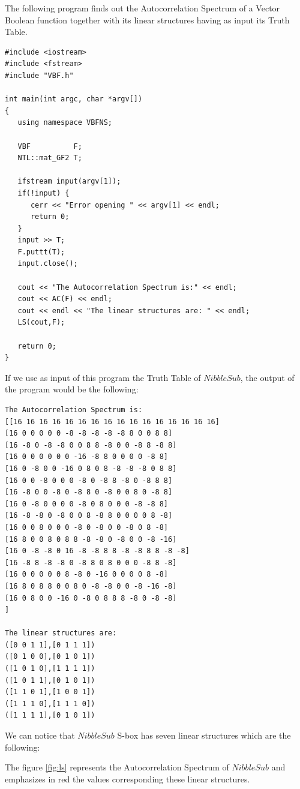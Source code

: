 \begin{example}
The following program finds out the Autocorrelation Spectrum of a Vector Boolean function together with its linear structures having as input its Truth Table.

\begin{verbatim}
#include <iostream>
#include <fstream>
#include "VBF.h"

int main(int argc, char *argv[])
{
   using namespace VBFNS;

   VBF          F;
   NTL::mat_GF2 T;

   ifstream input(argv[1]);
   if(!input) {
      cerr << "Error opening " << argv[1] << endl;
      return 0;
   }
   input >> T;
   F.puttt(T);
   input.close();

   cout << "The Autocorrelation Spectrum is:" << endl;
   cout << AC(F) << endl;
   cout << endl << "The linear structures are: " << endl;
   LS(cout,F);

   return 0;
}
\end{verbatim}

If we use as input of this program the Truth Table of $NibbleSub$, the output of the program would be the following:

\begin{verbatim}
The Autocorrelation Spectrum is:
[[16 16 16 16 16 16 16 16 16 16 16 16 16 16 16 16]
[16 0 0 0 0 0 -8 -8 -8 -8 -8 8 0 0 8 8]
[16 -8 0 -8 -8 0 0 8 8 -8 0 0 -8 8 -8 8]
[16 0 0 0 0 0 0 -16 -8 8 0 0 0 0 -8 8]
[16 0 -8 0 0 -16 0 8 0 8 -8 -8 -8 0 8 8]
[16 0 0 -8 0 0 0 -8 0 -8 8 -8 0 -8 8 8]
[16 -8 0 0 -8 0 -8 8 0 -8 0 0 8 0 -8 8]
[16 0 -8 0 0 0 0 -8 0 8 0 0 0 -8 -8 8]
[16 -8 -8 0 -8 0 0 8 -8 8 0 0 0 0 8 -8]
[16 0 0 8 0 0 0 -8 0 -8 0 0 -8 0 8 -8]
[16 8 0 0 8 0 8 8 -8 -8 0 -8 0 0 -8 -16]
[16 0 -8 -8 0 16 -8 -8 8 8 -8 -8 8 8 -8 -8]
[16 -8 8 -8 -8 0 -8 8 0 8 0 0 0 -8 8 -8]
[16 0 0 0 0 0 8 -8 0 -16 0 0 0 0 8 -8]
[16 8 0 8 8 0 0 8 0 -8 -8 0 0 -8 -16 -8]
[16 0 8 0 0 -16 0 -8 0 8 8 8 -8 0 -8 -8]
]

The linear structures are:
([0 0 1 1],[0 1 1 1])
([0 1 0 0],[0 1 0 1])
([1 0 1 0],[1 1 1 1])
([1 0 1 1],[0 1 0 1])
([1 1 0 1],[1 0 0 1])
([1 1 1 0],[1 1 1 0])
([1 1 1 1],[0 1 0 1])
\end{verbatim}

We can notice that $NibbleSub$ S-box has seven linear structures which are the following:

The figure \ref{fig:ls} represents the Autocorrelation Spectrum of $NibbleSub$ and emphasizes in red the values corresponding these linear structures.


\end{example}
